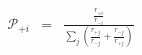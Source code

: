 \begin{eqnarray}
{\mathcal P}_{+i}  & = & \frac{\frac{r_{+i}}{r_{-i}}}{\sum_j\left(\frac{r_{+j}}{r_{-j}} + \frac{r_{-j}}{r_{+j}}  \right)} \\

\end{eqnarray}